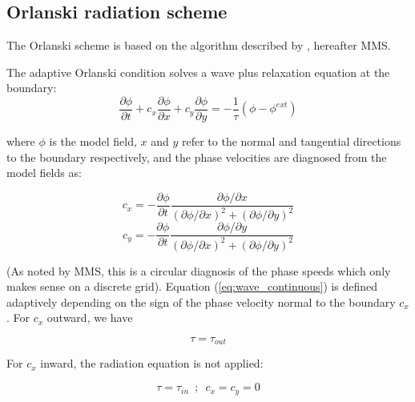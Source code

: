 \documentclass[../main/NEMO_manual]{subfiles}
\begin{document}
\subsection{Orlanski radiation scheme}
\label{subsec:BDY_orlanski_scheme}

The Orlanski scheme is based on the algorithm described by \citep{Marchesiello2001}, hereafter MMS.

The adaptive Orlanski condition solves a wave plus relaxation equation at the boundary:
\begin{equation}
\frac{\partial\phi}{\partial t} + c_x \frac{\partial\phi}{\partial x} + c_y \frac{\partial\phi}{\partial y} =
                                                -\frac{1}{\tau}(\phi - \phi^{ext})
\label{eq:wave_continuous}
\end{equation}

where $\phi$ is the model field, $x$ and $y$ refer to the normal and tangential directions to the boundary respectively, and the phase
velocities are diagnosed from the model fields as:

\begin{equation} \label{eq:cx}
c_x = -\frac{\partial\phi}{\partial t}\frac{\partial\phi / \partial x}{(\partial\phi /\partial x)^2 + (\partial\phi /\partial y)^2}
\end{equation}
\begin{equation}
\label{eq:cy}
c_y = -\frac{\partial\phi}{\partial t}\frac{\partial\phi / \partial y}{(\partial\phi /\partial x)^2 + (\partial\phi /\partial y)^2}
\end{equation}

(As noted by MMS, this is a circular diagnosis of the phase speeds which only makes sense on a discrete grid).
Equation (\autoref{eq:wave_continuous}) is defined adaptively depending on the sign of the phase velocity normal to the boundary $c_x$.
For $c_x$ outward, we have

\begin{equation}
\tau = \tau_{out}
\end{equation}

For $c_x$ inward, the radiation equation is not applied:

\begin{equation}
\tau = \tau_{in}\,\,\,;\,\,\, c_x = c_y = 0
\label{eq:tau_in}
\end{equation}
\end{document}
